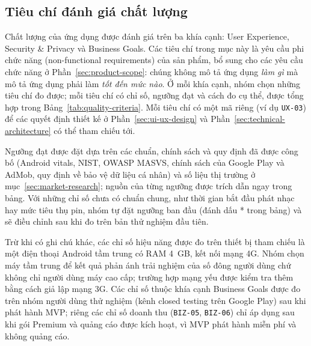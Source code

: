 \subsection{Tiêu chí đánh giá chất lượng}
\label{sec:quality-pillars}

Chất lượng của ứng dụng được đánh giá trên ba khía cạnh: User Experience, Security \& Privacy và Business Goals.
Các tiêu chí trong mục này là yêu cầu phi chức năng (non-functional requirements) của sản phẩm, bổ sung cho các yêu cầu chức năng ở Phần~\ref{sec:product-scope}: chúng không mô tả ứng dụng \textit{làm gì} mà mô tả ứng dụng phải làm \textit{tốt đến mức nào}.
Ở mỗi khía cạnh, nhóm chọn những tiêu chí đo được; mỗi tiêu chí có chỉ số, ngưỡng đạt và cách đo cụ thể, được tổng hợp trong Bảng~\ref{tab:quality-criteria}.
Mỗi tiêu chí có một mã riêng (ví dụ \texttt{UX-03}) để các quyết định thiết kế ở Phần~\ref{sec:ui-ux-design} và Phần~\ref{sec:technical-architecture} có thể tham chiếu tới.

Ngưỡng đạt được đặt dựa trên các chuẩn, chính sách và quy định đã được công bố (Android vitals, NIST, OWASP MASVS, chính sách của Google Play và AdMob, quy định về bảo vệ dữ liệu cá nhân) và số liệu thị trường ở mục~\ref{sec:market-research}; nguồn của từng ngưỡng được trích dẫn ngay trong bảng.
Với những chỉ số chưa có chuẩn chung, như thời gian bắt đầu phát nhạc hay mức tiêu thụ pin, nhóm tự đặt ngưỡng ban đầu (đánh dấu * trong bảng) và sẽ điều chỉnh sau khi đo trên bản thử nghiệm đầu tiên.

Trừ khi có ghi chú khác, các chỉ số hiệu năng được đo trên thiết bị tham chiếu là một điện thoại Android tầm trung có RAM 4~GB, kết nối mạng 4G.
Nhóm chọn máy tầm trung để kết quả phản ánh trải nghiệm của số đông người dùng chứ không chỉ người dùng máy cao cấp; trường hợp mạng yếu được kiểm tra thêm bằng cách giả lập mạng 3G.
Các chỉ số thuộc khía cạnh Business Goals được đo trên nhóm người dùng thử nghiệm (kênh closed testing trên Google Play) sau khi phát hành MVP; riêng các chỉ số doanh thu (\texttt{BIZ-05}, \texttt{BIZ-06}) chỉ áp dụng sau khi gói Premium và quảng cáo được kích hoạt, vì MVP phát hành miễn phí và không quảng cáo.

